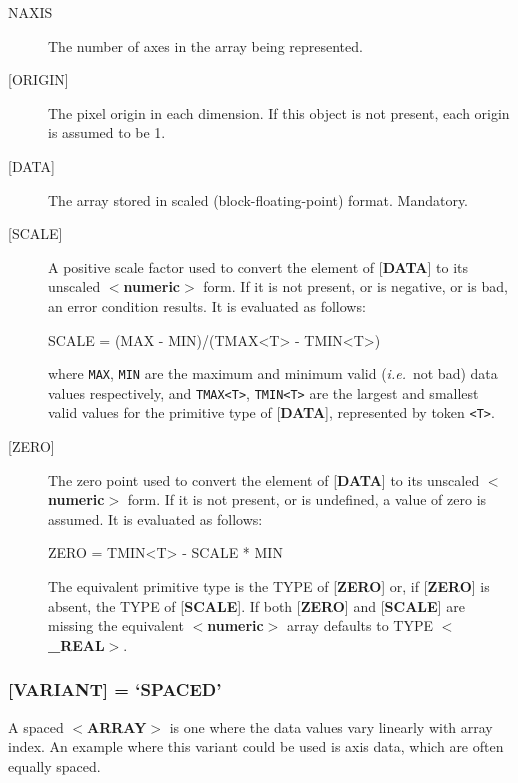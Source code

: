 \documentclass[twoside,11pt,nolof,noabs]{starlink}
\begin{document}
\begin{description}
\item [NAXIS]
The number of axes in the array being represented.
\item [{[}ORIGIN{]}]
The pixel origin in each dimension.  If this object is not present,
each origin is assumed to be 1.
\item [{[}DATA{]}]
The array stored in scaled (block-floating-point) format. Mandatory.
\item [{[}SCALE{]}]
A positive scale factor used to convert the element of
{[}\textbf{DATA}{]} to its
unscaled $<$\textbf{numeric}$>$ form.  If it is not present,
or is negative, or is bad, an error condition results.
It is evaluated as follows:
\begin{terminalv}

      SCALE = (MAX - MIN)/(TMAX<T> - TMIN<T>)

\end{terminalv}
where \texttt{MAX}, \texttt{MIN} are the maximum and minimum valid (\textit{i.e.}\  not bad)
data values respectively, and \texttt{TMAX<T>}, \texttt{TMIN<T>}  are
the largest and smallest valid values for the primitive type of {[}\textbf{DATA}{]}, represented
by token \texttt{<T>}.
\item [{[}ZERO{]}]
The zero point used to convert the element of {[}\textbf{DATA}{]} to its unscaled $<$\textbf{numeric}$>$ form.  If it is not
present,
or is undefined, a value of zero is assumed.  It is evaluated as follows:
\begin{terminalv}

      ZERO = TMIN<T> - SCALE * MIN

\end{terminalv}

The equivalent primitive type is the TYPE of {[}\textbf{ZERO}{]} or, if
{[}\textbf{ZERO}{]} is absent, the TYPE of {[}\textbf{SCALE}{]}.  If both
{[}\textbf{ZERO}{]} and {[}\textbf{SCALE}{]} are missing the equivalent
$<$\textbf{numeric}$>$ array defaults to TYPE $<$\textbf{\_REAL}$>$.
\end{description}

\subsubsection{{[}\textbf{VARIANT}{]} = `SPACED'}
A spaced \mbox{$<$\textbf{ARRAY}$>$} is one where the data values
vary linearly with array index.
An example where this variant could be used is axis data, which are
often equally spaced.
\end{document}

